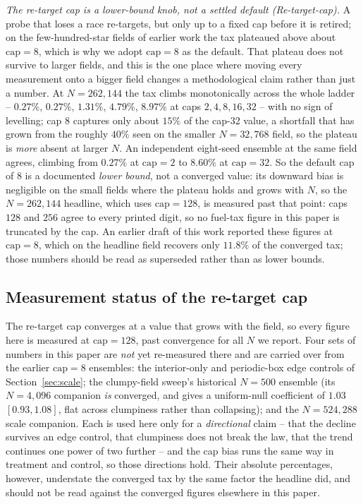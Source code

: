\emph{The re-target cap is a lower-bound knob, not a settled default (Re-target-cap).} A probe that
loses a race re-targets, but only up to a fixed cap before it is retired; on the few-hundred-star
fields of earlier work the tax plateaued above about $\text{cap} = 8$, which is why we adopt
$\text{cap} = 8$ as the default. That plateau does not survive to larger fields, and this is the one
place where moving every measurement onto a bigger field changes a methodological claim rather than
just a number. At $N = 262{,}144$ the tax climbs monotonically across the whole ladder -- $0.27\%$,
$0.27\%$, $1.31\%$, $4.79\%$, $8.97\%$ at caps $2, 4, 8, 16, 32$ -- with no sign of levelling; cap 8
captures only about $15\%$ of the cap-32 value, a shortfall that has grown from the roughly $40\%$
seen on the smaller $N = 32{,}768$ field, so the plateau is \emph{more} absent at larger $N$. An
independent eight-seed ensemble at the same field agrees, climbing from $0.27\%$ at
$\text{cap} = 2$ to $8.60\%$ at $\text{cap} = 32$. So the default cap of 8 is a
documented \emph{lower bound}, not a converged value: its downward bias is negligible on the small
fields where the plateau holds and grows with $N$, so the $N = 262{,}144$ headline, which uses
$\text{cap} = 128$, is measured past that point: caps $128$ and $256$ agree to every printed digit,
so no fuel-tax figure in this paper is truncated by the cap. An earlier draft of this work reported
these figures at $\text{cap} = 8$, which on the headline field recovers only $11.8\%$ of the
converged tax; those numbers should be read as superseded rather than as lower bounds.

\subsection{Measurement status of the re-target cap}
\label{sec:cap-status}
The re-target cap converges at a value that grows with the field, so every figure here is measured at
$\text{cap} = 128$, past convergence for all $N$ we report. Four sets of numbers in this paper are
\emph{not} yet re-measured there and are carried over from the earlier $\text{cap} = 8$ ensembles:
the interior-only and periodic-box edge controls of Section~\ref{sec:scale}; the clumpy-field sweep's
historical $N = 500$ ensemble (its $N = 4{,}096$ companion \emph{is} converged, and gives a uniform-null
coefficient of $1.03$ $[0.93, 1.08]$, flat across clumpiness rather than collapsing); and the
$N = 524{,}288$ scale companion. Each is used here only for a \emph{directional} claim -- that the
decline survives an edge control, that clumpiness does not break the law, that the trend continues one
power of two further -- and the cap bias runs the same way in treatment and control, so those
directions hold. Their absolute percentages, however, understate the converged tax by the same factor
the headline did, and should not be read against the converged figures elsewhere in this paper.

